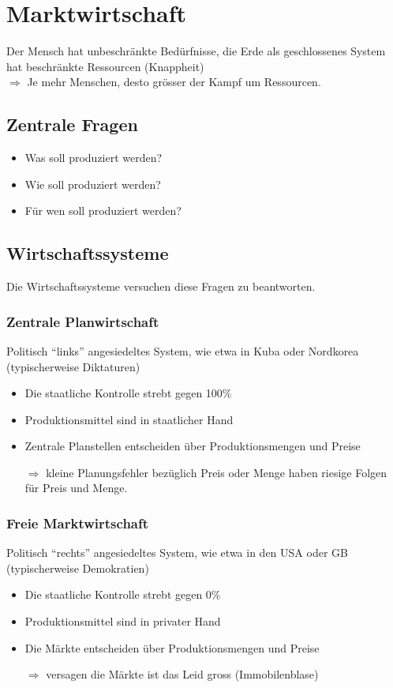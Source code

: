 \section{Marktwirtschaft}
Der Mensch hat unbeschränkte Bedürfnisse, die Erde als geschlossenes System hat beschränkte Ressourcen (Knappheit)\\ 
$\Rightarrow$ Je mehr Menschen, desto grösser der Kampf um Ressourcen.

\subsection{Zentrale Fragen}
\begin{itemize}\itemsep0em
	\item Was soll produziert werden?
	\item Wie soll produziert werden?
	\item Für wen soll produziert werden?
\end{itemize}

\subsection{Wirtschaftssysteme}
Die Wirtschaftssysteme versuchen diese Fragen zu beantworten.

\subsubsection{Zentrale Planwirtschaft}
Politisch \enquote{links} angesiedeltes System, wie etwa in Kuba oder Nordkorea (typischerweise Diktaturen)
\begin{itemize}\itemsep0em
	\item Die staatliche Kontrolle strebt gegen 100\%
	\item Produktionsmittel sind in staatlicher Hand
	\item Zentrale Planstellen entscheiden über Produktionsmengen und Preise
	\item [$\Rightarrow$] kleine Planungsfehler bezüglich Preis oder Menge haben riesige Folgen für Preis und Menge.
\end{itemize}

\subsubsection{Freie Marktwirtschaft}
Politisch \enquote{rechts} angesiedeltes System, wie etwa in den USA oder GB (typischerweise Demokratien)
\begin{itemize}\itemsep0em
	\item Die staatliche Kontrolle strebt gegen 0\%
	\item Produktionsmittel sind in privater Hand
	\item Die Märkte entscheiden über Produktionsmengen und Preise
	\item [$\Rightarrow$] versagen die Märkte ist das Leid gross (Immobilenblase)
\end{itemize}

